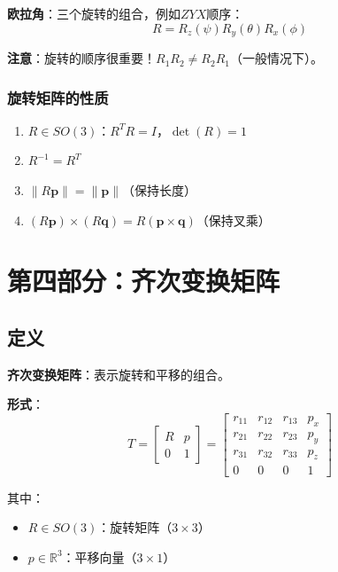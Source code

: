 \documentclass[12pt,a4paper]{article}
\begin{document}
\textbf{欧拉角}：三个旋转的组合，例如$ZYX$顺序：
\begin{equation}
R = R_z(\psi) R_y(\theta) R_x(\phi)
\end{equation}

\textbf{注意}：旋转的顺序很重要！$R_1 R_2 \neq R_2 R_1$（一般情况下）。

\subsubsection{旋转矩阵的性质}

\begin{enumerate}
\item $R \in SO(3)$：$R^T R = I$，$\det(R) = 1$
\item $R^{-1} = R^T$
\item $\|R\bm{p}\| = \|\bm{p}\|$（保持长度）
\item $(R\bm{p}) \times (R\bm{q}) = R(\bm{p} \times \bm{q})$（保持叉乘）
\end{enumerate}

\section{第四部分：齐次变换矩阵}

\subsection{定义}

\textbf{齐次变换矩阵}：表示旋转和平移的组合。

\textbf{形式}：
\begin{equation}
T = \begin{bmatrix} R & p \\ 0 & 1 \end{bmatrix} = \begin{bmatrix} r_{11} & r_{12} & r_{13} & p_x \\ r_{21} & r_{22} & r_{23} & p_y \\ r_{31} & r_{32} & r_{33} & p_z \\ 0 & 0 & 0 & 1 \end{bmatrix}
\end{equation}

其中：
\begin{itemize}
\item $R \in SO(3)$：旋转矩阵（$3 \times 3$）
\item $p \in \mathbb{R}^3$：平移向量（$3 \times 1$）
\end{itemize}
\end{document}
